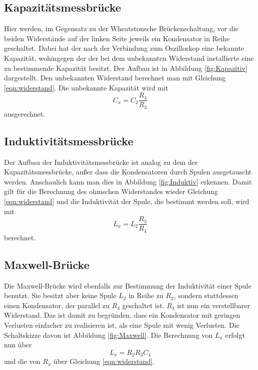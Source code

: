     \subsection{Kapazitätsmessbrücke}
    Hier werden, im Gegensatz zu der Wheatstonsche Brückenschaltung, vor die beiden Widerstände auf der linken Seite jeweils ein Kondensator in Reihe geschaltet.
    Dabei hat der nach der Verbindung zum Oszilloskop eine bekannte Kapazität, wohingegen der der bei dem unbekannten Widerstand installierte eine zu bestimmende Kapazität besitzt.
    Der Aufbau ist in Abbildung \ref{fig:Kapazitiv} dargestellt.
    Den unbekannten Widerstand berechnet man mit Gleichung \ref{eqn:widerstand}.
    Die unbekannte Kapazität wird mit
    \begin{equation}
        C_x=C_2 \frac{R_4}{R_3}
        \label{eqn:kapazität}
    \end{equation}
    ausgerechnet.

    \subsection{Induktivitätsmessbrücke}
    Der Aufbau der Induktivitätsmessbrücke ist analog zu dem der Kapazitätsmessbrücke, außer dass die Kondensatoren durch Spulen ausgetauscht werden.
    Anschaulich kann man dies in Abbildung \ref{fig:Induktiv} erkennen.
    Damit gilt für die Berechnung des ohmschen Widerstandes wieder Gleichung \ref{eqn:widerstand} und die Induktivität der Spule, die bestimmt werden soll, wird mit 
    \begin{equation}
        L_x=L_2 \frac{R_3}{R_4}
        \label{eqn:induktivität}
    \end{equation}
    berechnet.

    \subsection{Maxwell-Brücke}
    Die Maxwell-Brücke wird ebenfalls zur Bestimmung der Induktivität einer Spule benutzt.
    Sie besitzt aber keine Spule $L_2$ in Reihe zu $R_2$, sondern stattdessen einen Kondensator, der parallel zu $R_4$ geschaltet ist.
    $R_4$ ist nun ein verstellbarer Widerstand. Das ist damit zu begründen, dass ein Kondensator mit geringen Verlusten einfacher zu realisieren ist, als eine Spule mit wenig Verlusten.
    Die Schaltskizze davon ist Abbildung \ref{fig:Maxwell}.
    Die Berechnung von $L_x$ erfolgt nun über
    \begin{equation}
        L_x=R_2 R_3 C_4
        \label{eqn:maxwell}
    \end{equation}
    und die von $R_x$ über Gleichung \ref{eqn:widerstand}.

